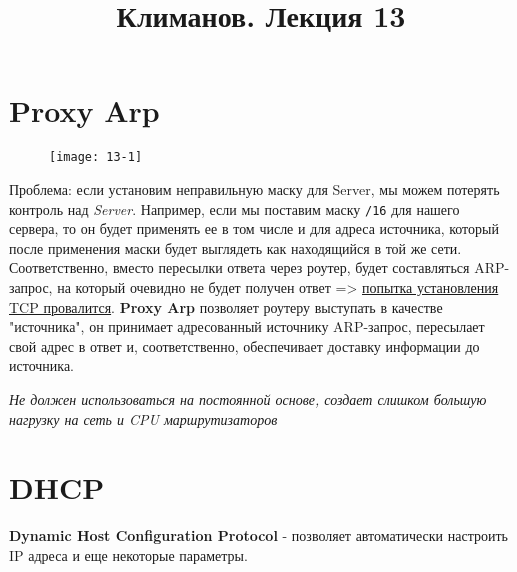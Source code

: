 \documentclass[a4paper,10pt]{article}
\title{Климанов. Лекция 13}
\begin{document}
	\maketitle
	\section{Proxy Arp}
	\begin{figure}[h!]
		\centering
		\texttt{[image: 13-1]}
	\end{figure}
	Проблема: если установим неправильную маску для Server, мы можем потерять контроль над \emph{Server}. Например, если мы поставим маску \texttt{/16} для нашего сервера, то он будет применять ее в том числе и для адреса источника, который после применения маски будет выглядеть как находящийся в той же сети. Соответственно, вместо пересылки ответа через роутер, будет составляться ARP-запрос, на который очевидно не будет получен ответ => \underline{попытка установления TCP провалится}.
	\textbf{Proxy Arp} позволяет роутеру выступать в качестве "источника", он принимает адресованный источнику ARP-запрос, пересылает свой адрес в ответ и, соответственно, обеспечивает доставку информации до источника.
	
	\textit{Не должен использоваться на постоянной основе, создает слишком большую нагрузку на сеть и CPU маршрутизаторов}
	
	\section{DHCP}
	\textbf{Dynamic Host Configuration Protocol} - позволяет автоматически настроить IP адреса и еще некоторые параметры.\\
	
\end{document}
